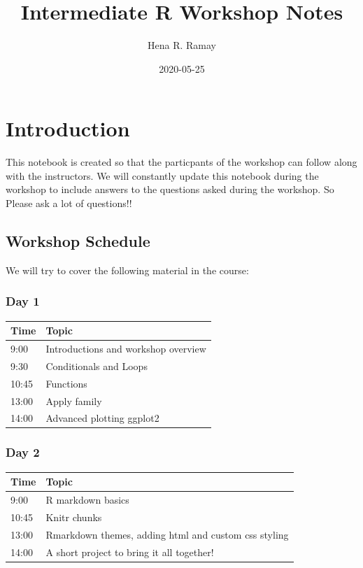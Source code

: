 \documentclass[
]{book}
\title{Intermediate R Workshop Notes}
\author{Hena R. Ramay}
\date{2020-05-25}
\begin{document}
\maketitle

{
\setcounter{tocdepth}{1}
\tableofcontents
}
\hypertarget{introduction}{%
\chapter{Introduction}\label{introduction}}

This notebook is created so that the particpants of the workshop can follow along with the instructors. We will constantly update this notebook during the workshop to include answers to the questions asked during the workshop. So Please ask a lot of questions!!

\hypertarget{workshop-schedule}{%
\section{Workshop Schedule}\label{workshop-schedule}}

We will try to cover the following material in the course:

\hypertarget{day-1}{%
\subsection*{Day 1}\label{day-1}}

\begin{longtable}[]{@{}ll@{}}
\toprule
Time & Topic\tabularnewline
\midrule
\endhead
9:00 & Introductions and workshop overview\tabularnewline
9:30 & Conditionals and Loops\tabularnewline
10:45 & Functions\tabularnewline
13:00 & Apply family\tabularnewline
14:00 & Advanced plotting ggplot2\tabularnewline
\bottomrule
\end{longtable}

\hypertarget{day-2}{%
\subsection*{Day 2}\label{day-2}}

\begin{longtable}[]{@{}ll@{}}
\toprule
Time & Topic\tabularnewline
\midrule
\endhead
9:00 & R markdown basics\tabularnewline
10:45 & Knitr chunks\tabularnewline
13:00 & Rmarkdown themes, adding html and custom css styling\tabularnewline
14:00 & A short project to bring it all together!\tabularnewline
\bottomrule
\end{longtable}
\end{document}

